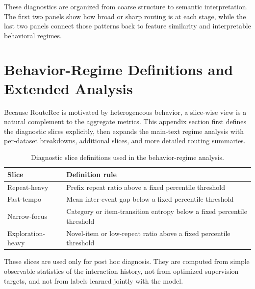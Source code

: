\documentclass[sigconf,review,anonymous]{acmart}
\begin{document}
These diagnostics are organized from coarse structure to semantic interpretation. The first two panels show how broad or sharp routing is at each stage, while the last two panels connect those patterns back to feature similarity and interpretable behavioral regimes.

\section{Behavior-Regime Definitions and Extended Analysis}
\label{app:behavior-slices}
Because RouteRec is motivated by heterogeneous behavior, a slice-wise view is a natural complement to the aggregate metrics. This appendix section first defines the diagnostic slices explicitly, then expands the main-text regime analysis with per-dataset breakdowns, additional slices, and more detailed routing summaries.

\begin{table}[t]
  \centering
  \caption{Diagnostic slice definitions used in the behavior-regime analysis.}
  \label{tab:appendix-slice-definitions}
  \scriptsize
  \setlength{\tabcolsep}{4pt}
  \begin{tabularx}{\columnwidth}{@{}lX@{}}
    \toprule
    Slice & Definition rule \\
    \midrule
    Repeat-heavy & Prefix repeat ratio above a fixed percentile threshold \\
    Fast-tempo & Mean inter-event gap below a fixed percentile threshold \\
    Narrow-focus & Category or item-transition entropy below a fixed percentile threshold \\
    Exploration-heavy & Novel-item or low-repeat ratio above a fixed percentile threshold \\
    \bottomrule
  \end{tabularx}
\end{table}

These slices are used only for post hoc diagnosis. They are computed from simple observable statistics of the interaction history, not from optimized supervision targets, and not from labels learned jointly with the model.
\end{document}
